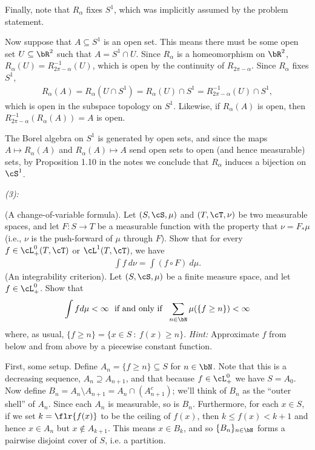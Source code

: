 \begin{homework}[e]
\begin{prf}
		Finally, note that $R_\alpha$ fixes $S^1$, which was implicitly assumed by the problem statement.

		Now suppose that $A \subseteq S^1$ is an open set. This means there must be some open set $U \subseteq \bR^2$ such that $A = S^1 \cap U$. Since $R_\alpha$ is a homeomorphism on $\bR^2$, $R_\alpha(U) = R^{-1}_{2\pi - \alpha}(U)$, which is open by the continuity of $R_{2\pi - \alpha}$. Since $R_\alpha$ fixes $S^1$,
		\begin{align*}
			R_\alpha(A) = R_\alpha(U \cap S^1) = R_\alpha(U) \cap S^1 = R^{-1}_{2\pi - \alpha}(U) \cap S^1,
		\end{align*}
		which is open in the subspace topology on $S^1$. Likewise, if $R_\alpha(A)$ is open, then $R^{-1}_{2\pi - \alpha}(R_\alpha(A)) = A$ is open.

		The Borel algebra on $S^1$ is generated by open sets, and since the maps $A \mapsto R_\alpha(A)$ and $R_\alpha(A) \mapsto A$ send open sets to open (and hence measurable) sets, by Proposition 1.10 in the notes we conclude that $R_\alpha$ induces a bijection on $\cS^1$.

		\bigskip

		\noindent \emph{(3):} \hspace{0.5em} 
	\end{prf}
	 (A change-of-variable formula). Let $(S,\cS,\mu)$ and $(T,\cT,\nu)$ be two measurable spaces, and let $F:S\to T$ be a measurable function with the property that $\nu = F_* \mu$ (i.e., $\nu$ is the push-forward of $\mu$ through $F$). Show that for every $f \in \cL^0_+(T,\cT)$ or $\cL^1(T,\cT)$, we have
	\begin{align*}
		\int f ~d\nu = \int (f\circ F) ~d\mu.
	\end{align*}
	 (An integrability criterion). Let $(S,\cS,\mu)$ be a finite measure space, and let $f \in \cL^0_+$. Show that 
	\begin{align*}
		\int f d\mu < \infty ~\text{ if and only if } ~ \sum_{n\in \bN} \mu(\{f \geq n\}) < \infty
	\end{align*}
	where, as usual, $\{f \geq n\} = \{x \in S ~:~ f(x) \geq n\}$. \small{\emph{Hint:} Approximate $f$ from below and from above by a piecewise constant function.}
	\begin{prf}
		First, some setup. Define $A_n = \{f \geq n\} \subseteq S$ for $n \in \bN$. Note that this is a decreasing sequence, $A_n \supseteq A_{n+1}$, and that because $f\in \cL_+^0$ we have $S = A_0$. Now define $B_n = A_n \setminus A_{n+1} = A_n \cap (A_{n+1}^c)$; we'll think of $B_n$ as the ``outer shell'' of $A_n$. Since each $A_n$ is measurable, so is $B_n$. Furthermore, for each $x \in S$, if we set $k = \flr{f(x)}$ to be the ceiling of $f(x)$, then $k \leq f(x) < k+1$ and hence $x \in A_n$ but $x \not\in A_{k+1}$. This means $x \in B_k$, and so $\{B_n\}_{n\in \bN}$ forms a pairwise disjoint cover of $S$, i.e. a partition.


\end{prf}
\end{homework}
